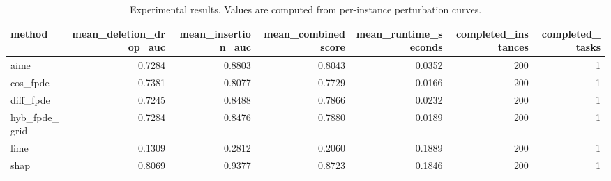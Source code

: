 \begin{table}[t]
\caption{Experimental results. Values are computed from per-instance perturbation curves.}
\label{tab:main_results_computed}
\centering
\begin{tabular}{lrrrrrr}
\toprule
method & mean\_deletion\_drop\_auc & mean\_insertion\_auc & mean\_combined\_score & mean\_runtime\_seconds & completed\_instances & completed\_tasks \\
\midrule
aime & 0.7284 & 0.8803 & 0.8043 & 0.0352 & 200 & 1 \\
cos\_fpde & 0.7381 & 0.8077 & 0.7729 & 0.0166 & 200 & 1 \\
diff\_fpde & 0.7245 & 0.8488 & 0.7866 & 0.0232 & 200 & 1 \\
hyb\_fpde\_grid & 0.7284 & 0.8476 & 0.7880 & 0.0189 & 200 & 1 \\
lime & 0.1309 & 0.2812 & 0.2060 & 0.1889 & 200 & 1 \\
shap & 0.8069 & 0.9377 & 0.8723 & 0.1846 & 200 & 1 \\
\bottomrule
\end{tabular}

\end{table}
